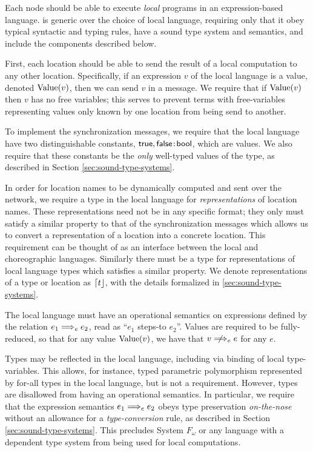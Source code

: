 Each node should be able to execute \emph{local} programs in an expression-based language.
\langname is generic over the choice of local language, requiring only that it obey typical syntactic and typing rules, have a sound type system and semantics, and include the components described below.

First, each location should be able to send the result of a local computation to any other location.
Specifically, if an expression $v$ of the local language is a value, denoted $\text{Value}({v})$, then we can send $v$ in a message.
We require that if $\text{Value}({v})$ then $v$ has no free variables; this serves to prevent terms with free-variables representing values only known by one location from being send to another.

To implement the synchronization messages, we require that the local language have two distinguishable constants, $\mathsf{true}, \mathsf{false} \mkern2mu{:}\mkern2mu \mathsf{bool}$, which are values.
We also require that these constants be the \emph{only} well-typed values of the \Bool type, as described in Section \ref{sec:sound-type-systems}.

In order for location names to be dynamically computed and sent over the network, we require a type \Loc in the local language for \emph{representations} of location names.
These representations need not be in any specific format; they only must satisfy a similar property to that of the synchronization messages which allows us to convert a representation of a location into a concrete location.
This requirement can be thought of as an interface between the local and choreographic languages.
Similarly there must be a type \Typ for representations of local language types which satisfies a similar property.
We denote representations of a type or location as $\lceil t\rfloor$, with the details formalized in \ref{sec:sound-type-systems}.

The local language must have an operational semantics on expressions defined by the relation $e_1 \localstep e_2$, read as ``$e_1$ steps-to $e_2$''.
Values are required to be fully-reduced, so that for any value $\text{Value}({v})$, we have that $v \nlocalstep e$ for any $e$.

Types may be reflected in the local language, including via binding of local type-variables.
This allows, for instance, typed parametric polymorphism represented by for-all types in the local language, but is not a requirement.
However, types are disallowed from having an operational semantics.
In particular, we require that the expression semantics $e_1 \localstep e_2$ obeys type preservation \emph{on-the-nose} without an allowance for a \emph{type-conversion} rule, as described in Section \ref{sec:sound-type-systems}.
This precludes System $F_\omega$ or any language with a dependent type system from being used for local computations.

